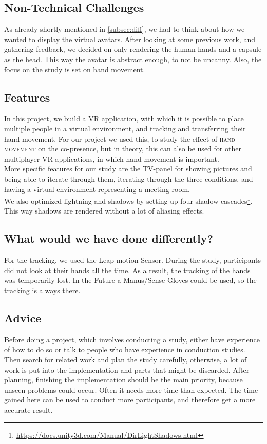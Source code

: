 \documentclass[english,runningheads,a4paper]{llncs}[2018/03/10]
\begin{document}
\subsection{Non-Technical Challenges}
As already shortly mentioned in \cref{subsec:diff}, we had to think about how we wanted to display the virtual avatars. 
After looking at some previous work, and gathering feedback, we decided on only rendering the human hands and a capsule as the head. 
This way the avatar is abstract enough, to not be uncanny.
Also, the focus on the study is set on hand movement.

\subsection{Features}
In this project, we build a VR application, with which it is possible to place multiple people in a virtual environment, and tracking and transferring their hand movement. 
For our project we used this, to study the effect of \textsc{hand movement} on the co-presence, but in theory, this can also be used for other multiplayer VR applications, in which hand movement is important. \\ \linebreak
More specific features for our study are the TV-panel for showing pictures and being able to iterate through them, iterating through the three conditions, and having a virtual environment representing a meeting room. \\ \linebreak
We also optimized lightning and shadows by setting up four shadow cascades\footnote{\url{https://docs.unity3d.com/Manual/DirLightShadows.html}}. 
This way shadows are rendered without a lot of aliasing effects.

\subsection{What would we have done differently?}
For the tracking, we used the Leap motion-Sensor. 
During the study, participants did not look at their hands all the time. 
As a result, the tracking of the hands was temporarily lost. In the Future a Manus/Sense Gloves could be used, so the tracking is always there.

\subsection{Advice}
Before doing a project, which involves conducting a study, either have experience of how to do so or talk to people who have experience in conduction studies. 
Then search for related work and plan the study carefully, otherwise, a lot of work is put into the implementation and parts that might be discarded.
After planning, finishing the implementation should be the main priority, because unseen problems could occur.
Often it needs more time than expected. 
The time gained here can be used to conduct more participants, and therefore get a more accurate result.
\end{document}
